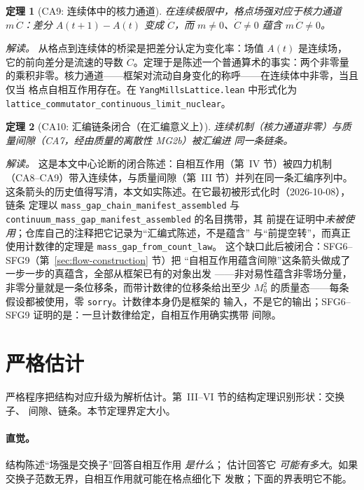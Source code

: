 \documentclass[aps,prd,preprint,superscriptaddress,amsmath,amssymb]{revtex4-2}
\newtheorem{theorem}{定理}[section]
\begin{document}
\begin{theorem}[CA9: 连续体中的核力通道]
\label{thm:ca9}
在连续极限中，格点场强对应于核力通道 $m\,\dot C$：差分 $A(t{+}1)-A(t)$
变成 $\dot C$，而 $m\neq0$、$\dot C\neq0$ 蕴含 $m\,\dot C\neq0$。
\end{theorem}

\emph{解读。} 从格点到连续体的桥梁是把差分认定为变化率：场值 $A(t)$ 是连续场，
它的前向差分是流速的导数 $\dot C$。定理于是陈述一个普通算术的事实：两个非零量
的乘积非零。核力通道——框架对流动自身变化的称呼——在连续体中非零，当且仅当
格点自相互作用存在。在 \texttt{YangMillsLattice.lean} 中形式化为
\texttt{lattice\_commutator\_continuous\_limit\_nuclear}。

\begin{theorem}[CA10: 汇编链条闭合（在汇编意义上）]
\label{thm:ca10}
连续机制（核力通道非零）与质量间隙（CA7，经由质量的离散性 MG2b）被汇编进
同一条链条。
\end{theorem}

\emph{解读。} 这是本文中心论断的闭合陈述：自相互作用（第~IV 节）被四力机制
（CA8--CA9）带入连续体，与质量间隙（第~III 节）并列在同一条汇编序列中。
这条箭头的历史值得写清，本文如实陈述。在它最初被形式化时（2026-10-08），链条
定理以 \texttt{mass\_gap\_chain\_\allowbreak manifest\_assembled} 与
\texttt{continuum\_mass\_gap\_\allowbreak manifest\_assembled} 的名目携带，其
前提在证明中\emph{未被使用}；仓库自己的注释把它记录为``汇编式陈述，不是蕴含''
与``前提空转''，而真正使用计数律的定理是 \texttt{mass\_gap\_from\_count\_law}。
这个缺口此后被闭合：SFG6--SFG9（第~\ref{sec:flow-construction} 节）把
``自相互作用蕴含间隙''这条箭头做成了一步一步的真蕴含，全部从框架已有的对象出发
——非对易性蕴含非零场分量，非零分量就是一条位移条，而带计数律的位移条给出至少
$M_0^2$ 的质量态——每条假设都被使用，零 \texttt{sorry}。计数律本身仍是框架的
输入，不是它的输出；SFG6--SFG9 证明的是：一旦计数律给定，自相互作用确实携带
间隙。

\section{严格估计}
\label{sec:strict}

严格程序把结构对应升级为解析估计。第~III--VI 节的结构定理识别形状：交换子、
间隙、链条。本节定理界定大小。

\paragraph{直觉。} 结构陈述``场强是交换子''回答自相互作用 \emph{是什么}；
估计回答它 \emph{可能有多大}。如果交换子范数无界，自相互作用就可能在格点细化下
发散；下面的界表明它不能。
\end{document}
